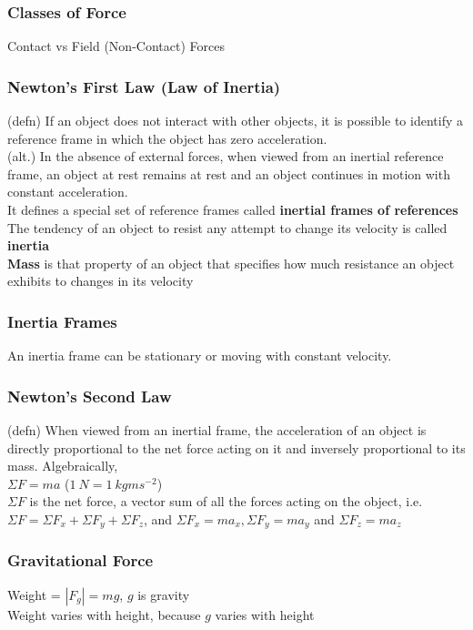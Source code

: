 \documentclass[10 pt]{article}
\begin{document}
\begin{multicols}{2}
\subsubsection*{Classes of Force}
\noindent Contact vs Field (Non-Contact) Forces
\subsubsection*{Newton's First Law (Law of Inertia)}
\noindent (defn) If an object does not interact with other objects, it is possible to identify a reference frame in which the object has zero acceleration.\\	
\noindent (alt.) In the absence of external forces, when viewed from an inertial reference frame, an object at rest remains at rest and an object continues in motion with constant acceleration.\\
It defines a special set of reference frames called \textbf{inertial frames of references}\\
The tendency of an object to resist any attempt to change its velocity is called \textbf{inertia}\\
\textbf{Mass} is that property of an object that specifies how much resistance an object exhibits to changes in its velocity
\subsubsection*{Inertia Frames}
\noindent An inertia frame can be stationary or moving with constant velocity.
\subsubsection*{Newton's Second Law}
\noindent (defn) When viewed from an inertial frame, the acceleration of an object is directly proportional to the net force acting on it and inversely proportional to its mass. Algebraically,\\
\indent $\Sigma F = ma$ ($1~N = 1~kg m s^{-2}$)\\
$\Sigma F$ is the net force, a vector sum of all the forces acting on the object, i.e. $\Sigma F = \Sigma F_x + \Sigma F_y + \Sigma F_z$, and $\Sigma F_x = ma_x, \Sigma F_y = ma_y$ and $\Sigma F_z = ma_z$
\subsubsection*{Gravitational Force}
Weight = $|F_g| = mg$, $g$ is gravity\\
Weight varies with height, because $g$ varies with height

\end{multicols}
\end{document}
